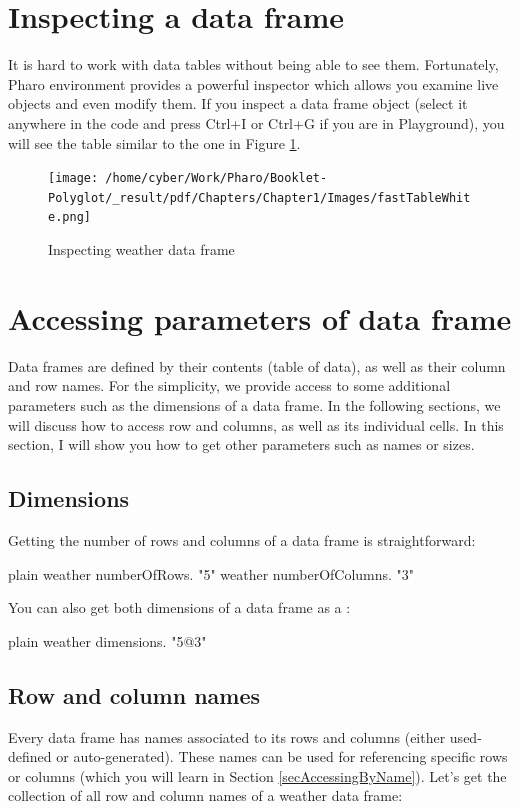 \documentclass[10pt,twoside,english]{_support/latex/sbabook/sbabook}
\begin{document}
\section{Inspecting a data frame}
It is hard to work with data tables without being able to see them. Fortunately, Pharo environment provides a powerful inspector which allows you examine live objects and even modify them. If you inspect a data frame object (select it anywhere in the code and press Ctrl+I or Ctrl+G if you are in Playground), you will see the table similar to the one in Figure \ref{inspector}.


\begin{figure}

\begin{center}
\texttt{[image: /home/cyber/Work/Pharo/Booklet-Polyglot/\_result/pdf/Chapters/Chapter1/Images/fastTableWhite.png]}\caption{Inspecting weather data frame \label{inspector}}\end{center}
\end{figure}

\section{Accessing parameters of data frame}
Data frames are defined by their contents (table of data), as well as their column and row names. For the simplicity, we provide access to some additional parameters such as the dimensions of a data frame. In the following sections, we will discuss how to access row and columns, as well as its individual cells. In this section, I will show you how to get other parameters such as names or sizes.
\subsection{Dimensions}
Getting the number of rows and columns of a data frame is straightforward:

\begin{displaycode}{plain}
weather numberOfRows. "5"
weather numberOfColumns. "3"
\end{displaycode}

You can also get both dimensions of a data frame as a :

\begin{displaycode}{plain}
weather dimensions. "5@3"
\end{displaycode}
\subsection{Row and column names}
Every data frame has names associated to its rows and columns (either used-defined or auto-generated). These names can be used for referencing specific rows or columns (which you will learn in Section \ref{secAccessingByName}). Let's get the collection of all row and column names of a weather data frame:
\end{document}
